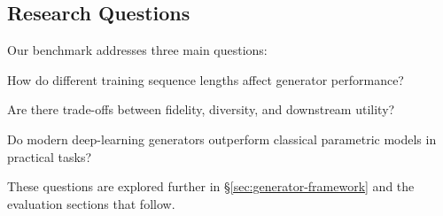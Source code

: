   \subsection{Research Questions}
    Our benchmark addresses three main questions:
    \begin{enumerate}[label=\textbf{[Q\arabic*]}]
      \item How do different training sequence lengths affect generator
        performance?
      \item Are there trade-offs between fidelity, diversity, and
        downstream utility?
      \item Do modern deep-learning generators outperform classical
        parametric models in practical tasks?
    \end{enumerate}
    These questions are explored further in
    §\ref{sec:generator-framework} and the evaluation sections that
    follow.

